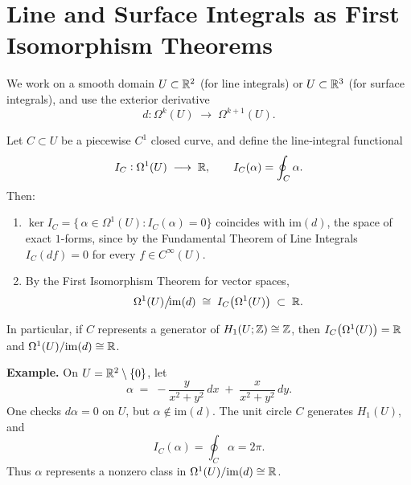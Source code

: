 \documentclass[11pt,openany]{article}
\begin{document}
\newpage

\section{Line and Surface Integrals as First Isomorphism Theorems}

We work on a smooth domain \(U\subset\mathbb{R}^2\) (for line integrals) or \(U\subset\mathbb{R}^3\) (for surface integrals), and use the exterior derivative
\[
d:\Omega^k(U)\;\longrightarrow\;\Omega^{k+1}(U).
\]

\begin{proposition}
	Let \(C\subset U\) be a piecewise \(C^1\) closed curve, and define the line‐integral functional
	\[
	I_C:\Omega^1(U)\;\longrightarrow\;\mathbb{R},
	\qquad
	I_C(\alpha)=\oint_{C}\alpha.
	\]
	Then:
	\begin{enumerate}
		\item \(\displaystyle\ker I_C=\{\,\alpha\in\Omega^1(U):I_C(\alpha)=0\}\) coincides with \(\mathrm{im}(d)\), the space of exact \(1\)-forms, since by the Fundamental Theorem of Line Integrals
		\(\displaystyle I_C(df)=0\) for every \(f\in C^\infty(U)\).
		\item By the First Isomorphism Theorem for vector spaces,
		\[
		\Omega^1(U)\big/\!\mathrm{im}(d)
		\;\cong\;
		I_C\bigl(\Omega^1(U)\bigr)
		\;\subset\;\mathbb{R}.
		\]
	\end{enumerate}
	In particular, if \(C\) represents a generator of \(H_1(U;\mathbb{Z})\cong\mathbb{Z}\), then \(I_C\bigl(\Omega^1(U)\bigr)=\mathbb{R}\) and
	\(\Omega^1(U)/\mathrm{im}(d)\cong\mathbb{R}\).
	
	\medskip
	
	\noindent\textbf{Example.}  On \(U=\mathbb{R}^2\setminus\{0\}\), let
	\[
	\alpha \;=\;
	-\frac{y}{x^2+y^2}\,dx \;+\;\frac{x}{x^2+y^2}\,dy.
	\]
	One checks \(d\alpha=0\) on \(U\), but \(\alpha\not\in\mathrm{im}(d)\).  The unit circle \(C\) generates \(H_1(U)\), and
	\[
	I_C(\alpha)
	=\oint_{C}\alpha
	=2\pi.
	\]
	Thus \(\alpha\) represents a nonzero class in 
	\(\Omega^1(U)/\mathrm{im}(d)\cong\mathbb{R}\).
	
\end{proposition}
\end{document}
